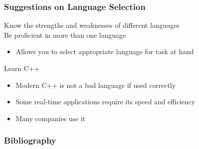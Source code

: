 \documentclass[xetex,professionalfont]{beamer}
\begin{document}

\begin{frame}
\frametitle{Suggestions on Language Selection}

Know the strengths and weaknesses of different languages\\
Be proficient in more than one language
\begin{itemize}
	\item Allows you to select appropriate language for task at hand
\end{itemize}

\bigskip
Learn C++
\begin{itemize}
	\item Modern C++ is not a bad language if used correctly
	\item Some real-time applications require its speed and efficiency
	\item Many companies use it
\end{itemize}

\end{frame}


\begin{frame}
\frametitle{Bibliography}

\printbibliography

\end{frame}
\end{document}
